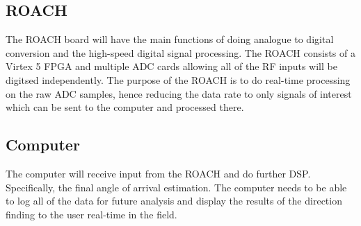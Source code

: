 \subsection{ROACH}
The ROACH board will have the main functions of doing analogue to digital conversion and the high-speed digital signal processing. The ROACH consists of a Virtex 5 FPGA and multiple ADC cards allowing all of the RF inputs will be digitsed independently. The purpose of the ROACH is to do real-time processing on the raw ADC samples, hence reducing the data rate to only signals of interest which can be sent to the computer and processed there.

\subsection{Computer}
The computer will receive input from the ROACH and do further DSP. Specifically, the final angle of arrival estimation. The computer needs to be able to log all of the data for future analysis and display the results of the direction finding to the user real-time in the field.


